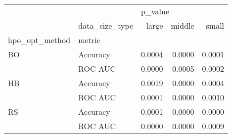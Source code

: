 \begin{tabular}{llrrr}
\toprule
   & {} & \multicolumn{3}{l}{p\_value} \\
   & data\_size\_type &   large &  middle &   small \\
hpo\_opt\_method & metric &         &         &         \\
\midrule
BO & Accuracy &  0.0004 &  0.0000 &  0.0001 \\
   & ROC AUC &  0.0000 &  0.0005 &  0.0002 \\
HB & Accuracy &  0.0019 &  0.0000 &  0.0004 \\
   & ROC AUC &  0.0001 &  0.0000 &  0.0010 \\
RS & Accuracy &  0.0001 &  0.0000 &  0.0000 \\
   & ROC AUC &  0.0000 &  0.0000 &  0.0009 \\
\bottomrule
\end{tabular}
